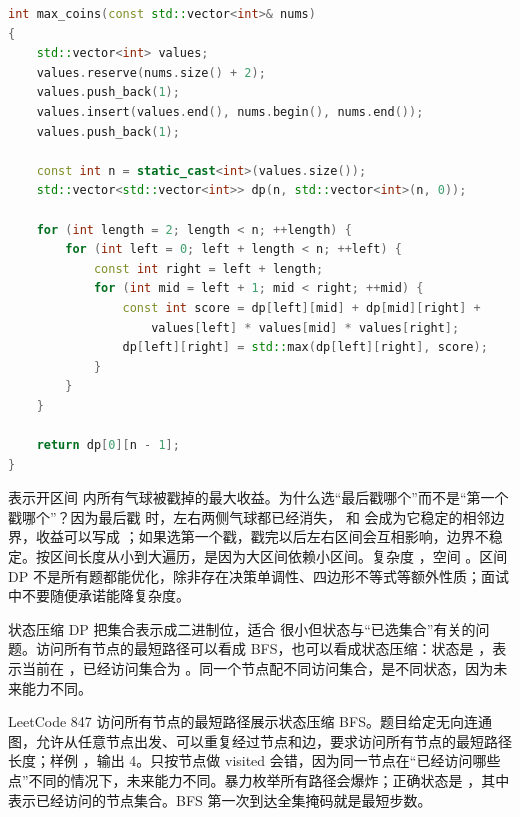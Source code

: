 \begin{lstlisting}[language=C++,caption={LeetCode 312 戳气球：区间 DP 枚举最后操作点}]
int max_coins(const std::vector<int>& nums)
{
    std::vector<int> values;
    values.reserve(nums.size() + 2);
    values.push_back(1);
    values.insert(values.end(), nums.begin(), nums.end());
    values.push_back(1);

    const int n = static_cast<int>(values.size());
    std::vector<std::vector<int>> dp(n, std::vector<int>(n, 0));

    for (int length = 2; length < n; ++length) {
        for (int left = 0; left + length < n; ++left) {
            const int right = left + length;
            for (int mid = left + 1; mid < right; ++mid) {
                const int score = dp[left][mid] + dp[mid][right] +
                    values[left] * values[mid] * values[right];
                dp[left][right] = std::max(dp[left][right], score);
            }
        }
    }

    return dp[0][n - 1];
}
\end{lstlisting}

 表示开区间  内所有气球被戳掉的最大收益。为什么选“最后戳哪个”而不是“第一个戳哪个”？因为最后戳  时，左右两侧气球都已经消失， 和  会成为它稳定的相邻边界，收益可以写成 ；如果选第一个戳，戳完以后左右区间会互相影响，边界不稳定。按区间长度从小到大遍历，是因为大区间依赖小区间。复杂度 ，空间 。区间 DP 不是所有题都能优化，除非存在决策单调性、四边形不等式等额外性质；面试中不要随便承诺能降复杂度。

状态压缩 DP 把集合表示成二进制位，适合  很小但状态与“已选集合”有关的问题。访问所有节点的最短路径可以看成 BFS，也可以看成状态压缩：状态是 ，表示当前在 ，已经访问集合为 。同一个节点配不同访问集合，是不同状态，因为未来能力不同。

LeetCode 847 访问所有节点的最短路径展示状态压缩 BFS。题目给定无向连通图，允许从任意节点出发、可以重复经过节点和边，要求访问所有节点的最短路径长度；样例 ，输出 4。只按节点做 visited 会错，因为同一节点在“已经访问哪些点”不同的情况下，未来能力不同。暴力枚举所有路径会爆炸；正确状态是 ，其中  表示已经访问的节点集合。BFS 第一次到达全集掩码就是最短步数。

